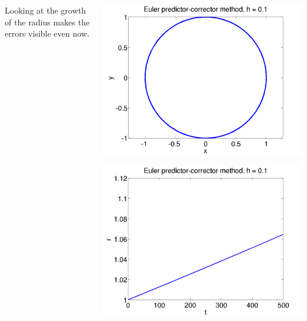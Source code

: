 \documentclass{beamer}
\begin{document}
\begin{frame}
\begin{columns}
\begin{column}{0.5\textwidth}
\begin{overlayarea}{\textwidth}{0.4\textheight}
{          \vspace{1ex}
          Looking at the growth of the radius makes the errors
          visible even now.
        }
      \end{overlayarea}
    \end{column}
    \begin{column}{0.5\textwidth}
      \begin{overlayarea}{\textwidth}{0.6\textheight}
        {
          \begin{center}
            \includegraphics[height=0.5\textheight]{figures/EulerPC1}
          \end{center}
        }
        {
          \begin{center}
            \includegraphics[height=0.5\textheight]{figures/EulerPC_rad1}

\end{center}}
\end{overlayarea}
\end{column}
\end{columns}
\end{frame}
\end{document}

